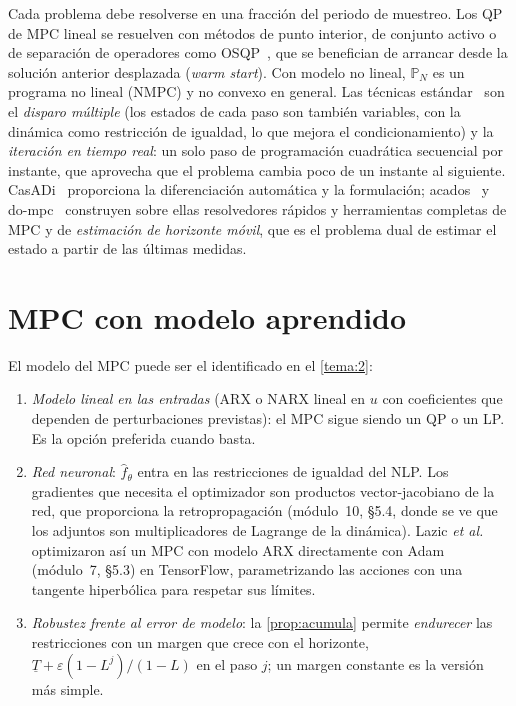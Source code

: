 Cada problema debe resolverse en una fracción del periodo de muestreo. Los QP de MPC lineal se resuelven con métodos de punto interior, de conjunto activo o de separación de operadores como OSQP~\cite{osqp}, que se benefician de arrancar desde la solución anterior desplazada (\emph{warm start}). Con modelo no lineal, $\mathbb P_N$ es un programa no lineal (NMPC) y no convexo en general. Las técnicas estándar~\cite[cap.~8]{rmd} son el \emph{disparo múltiple} (los estados de cada paso son también variables, con la dinámica como restricción de igualdad, lo que mejora el condicionamiento) y la \emph{iteración en tiempo real}: un solo paso de programación cuadrática secuencial por instante, que aprovecha que el problema cambia poco de un instante al siguiente. CasADi~\cite{casadi} proporciona la diferenciación automática y la formulación; acados~\cite{acados} y do-mpc~\cite{dompc} construyen sobre ellas resolvedores rápidos y herramientas completas de MPC y de \emph{estimación de horizonte móvil}, que es el problema dual de estimar el estado a partir de las últimas medidas.

\section{MPC con modelo aprendido}

El modelo del MPC puede ser el identificado en el \cref{tema:2}:
\begin{enumerate}
  \item \emph{Modelo lineal en las entradas} (ARX o NARX lineal en $u$ con coeficientes que dependen de perturbaciones previstas): el MPC sigue siendo un QP o un LP. Es la opción preferida cuando basta.
  \item \emph{Red neuronal}: $\hat f_\theta$ entra en las restricciones de igualdad del NLP. Los gradientes que necesita el optimizador son productos vector-jacobiano de la red, que proporciona la retropropagación (módulo~10, §5.4, donde se ve que los adjuntos son multiplicadores de Lagrange de la dinámica). Lazic \emph{et al.}~\cite{lazic} optimizaron así un MPC con modelo ARX directamente con Adam (módulo~7, §5.3) en TensorFlow, parametrizando las acciones con una tangente hiperbólica para respetar sus límites.
  \item \emph{Robustez frente al error de modelo}: la \cref{prop:acumula} permite \emph{endurecer} las restricciones con un margen que crece con el horizonte, $\underline T+\varepsilon(1-L^{j})/(1-L)$ en el paso $j$; un margen constante es la versión más simple.
\end{enumerate}

